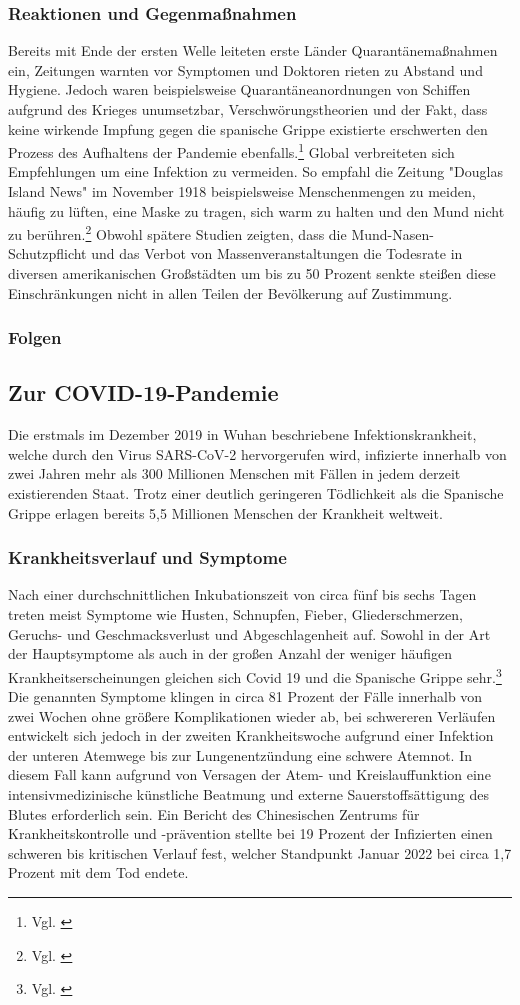 \documentclass[12pt]{article}
\begin{document}
\subsubsection{Reaktionen und Gegenmaßnahmen}
Bereits mit Ende der ersten Welle leiteten erste Länder Quarantänemaßnahmen ein, Zeitungen warnten vor Symptomen und Doktoren rieten zu Abstand und Hygiene. Jedoch waren beispielsweise Quarantäneanordnungen von Schiffen aufgrund des Krieges unumsetzbar, Verschwörungstheorien und der Fakt, dass keine wirkende Impfung gegen die spanische Grippe existierte erschwerten den Prozess des Aufhaltens der Pandemie ebenfalls.\footnote{Vgl. \cite{Hist10}} Global verbreiteten sich Empfehlungen um eine Infektion zu vermeiden. So empfahl die Zeitung "Douglas Island News" im November 1918 beispielsweise Menschenmengen zu meiden, häufig zu lüften, eine Maske zu tragen, sich warm zu halten und den Mund nicht zu berühren.\footnote{Vgl. \cite{Mai2021}} Obwohl spätere Studien zeigten, dass die Mund-Nasen-Schutzpflicht und das Verbot von Massenveranstaltungen die Todesrate in diversen amerikanischen Großstädten um bis zu 50 Prozent senkte steißen diese Einschränkungen nicht in allen Teilen der Bevölkerung auf Zustimmung.
\subsubsection{Folgen}

\subsection{Zur COVID-19-Pandemie}
Die erstmals im Dezember 2019 in Wuhan beschriebene Infektionskrankheit, welche durch den Virus SARS-CoV-2 hervorgerufen wird, infizierte innerhalb von zwei Jahren mehr als 300 Millionen Menschen mit Fällen in jedem derzeit existierenden Staat. Trotz einer deutlich geringeren Tödlichkeit als die Spanische Grippe erlagen bereits 5,5 Millionen Menschen der Krankheit weltweit. 
\subsubsection{Krankheitsverlauf und Symptome}
 Nach einer durchschnittlichen Inkubationszeit von circa fünf bis sechs Tagen treten meist Symptome wie Husten, Schnupfen, Fieber, Gliederschmerzen, Geruchs- und Geschmacksverlust und Abgeschlagenheit auf. Sowohl in der Art der Hauptsymptome als auch in der großen Anzahl der weniger häufigen Krankheitserscheinungen gleichen sich Covid 19 und die Spanische Grippe sehr.\footnote{Vgl. \cite{Gov21}} Die genannten Symptome klingen in circa 81 Prozent der Fälle innerhalb von zwei Wochen ohne größere Komplikationen wieder ab, bei schwereren Verläufen entwickelt sich jedoch in der zweiten Krankheitswoche aufgrund einer Infektion der unteren Atemwege bis zur Lungenentzündung eine schwere Atemnot. In diesem Fall kann aufgrund von Versagen der Atem- und Kreislauffunktion eine intensivmedizinische künstliche Beatmung und externe Sauerstoffsättigung des Blutes erforderlich sein. Ein Bericht des Chinesischen Zentrums für Krankheitskontrolle und -prävention stellte bei 19 Prozent der Infizierten einen schweren bis kritischen Verlauf fest, welcher Standpunkt Januar 2022 bei circa 1,7 Prozent mit dem Tod endete.
\end{document}
